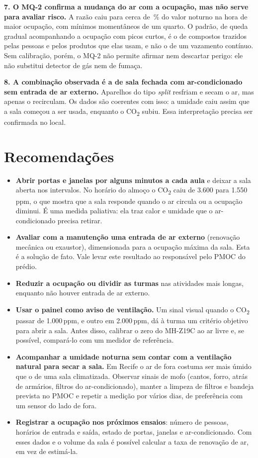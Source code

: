 \documentclass[11pt,a4paper]{article}
\newcommand{\cod}{CO\textsubscript{2}}
\begin{document}
\textbf{7. O MQ-2 confirma a mudança do ar com a ocupação, mas não serve para avaliar risco.} A razão caiu para cerca de \MqPctMenorMediaHora\,\% do valor noturno na hora de maior ocupação, com mínimos momentâneos de um quarto. O padrão, de queda gradual acompanhando a ocupação com picos curtos, é o de compostos trazidos pelas pessoas e pelos produtos que elas usam, e não o de um vazamento contínuo. Sem calibração, porém, o MQ-2 não permite afirmar nem descartar perigo: ele não substitui detector de gás nem de fumaça.

\textbf{8. A combinação observada é a de sala fechada com ar-condicionado sem entrada de ar externo.} Aparelhos do tipo \emph{split} resfriam e secam o ar, mas apenas o recirculam. Os dados são coerentes com isso: a umidade caiu assim que a sala começou a ser usada, enquanto o \cod{} subiu. Essa interpretação precisa ser confirmada no local.

\section{Recomendações}
\label{sec:recomendacoes}

\enlargethispage{2\baselineskip}
\begin{itemize}
\item \textbf{Abrir portas e janelas por alguns minutos a cada aula} e deixar a sala aberta nos intervalos. No horário do almoço o \cod{} caiu de 3.600 para 1.550\,ppm, o que mostra que a sala responde quando o ar circula ou a ocupação diminui. É uma medida paliativa: ela traz calor e umidade que o ar-condicionado precisa retirar.
\item \textbf{Avaliar com a manutenção uma entrada de ar externo} (renovação mecânica ou exaustor), dimensionada para a ocupação máxima da sala. Esta é a solução de fato. Vale levar este resultado ao responsável pelo PMOC do prédio.
\item \textbf{Reduzir a ocupação ou dividir as turmas} nas atividades mais longas, enquanto não houver entrada de ar externo.
\item \textbf{Usar o painel como aviso de ventilação.} Um sinal visual quando o \cod{} passar de 1.000\,ppm, e outro em 2.000\,ppm, dá à turma um critério objetivo para abrir a sala. Antes disso, calibrar o zero do MH-Z19C ao ar livre e, se possível, compará-lo com um medidor de referência.
\item \textbf{Acompanhar a umidade noturna sem contar com a ventilação natural para secar a sala.} Em Recife o ar de fora costuma ser mais úmido que o de uma sala climatizada. Observar sinais de mofo (cantos, forro, atrás de armários, filtros do ar-condicionado), manter a limpeza de filtros e bandeja prevista no PMOC e repetir a medição por vários dias, de preferência com um sensor do lado de fora.
\item \textbf{Registrar a ocupação nos próximos ensaios}: número de pessoas, horários de entrada e saída, estado de portas, janelas e ar-condicionado. Com esses dados e o volume da sala é possível calcular a taxa de renovação de ar, em vez de estimá-la.
\end{itemize}
\end{document}
